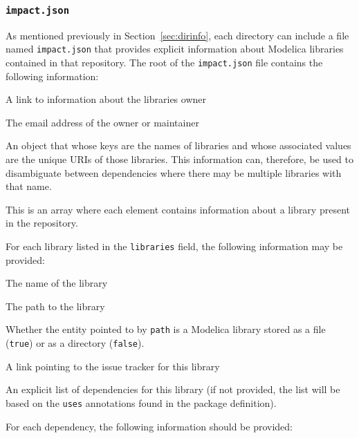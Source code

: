 \documentclass[11pt,a4paper,twocolumn]{article}
\newcommand{\code}[1]{\texttt{#1}} %
\begin{document}
\subsubsection{\code{impact.json}}
\label{sec:dirinfo_schema}

As mentioned previously in Section~\ref{sec:dirinfo}, each directory
can include a file named \code{impact.json} that provides explicit
information about Modelica libraries contained in that repository.
The root of the \code{impact.json} file contains the following
information:

\begin{description}[noitemsep]
  \item[\code{owner\_uri}] A link to information about the libraries
    owner
  \item[\code{email}] The email address of the owner or maintainer
  \item[\code{alias}] An object that whose keys are the names of
    libraries and whose associated values are the unique URIs of those
    libraries.  This information can, therefore, be used to
    disambiguate between dependencies where there may be multiple
    libraries with that name.
  \item[\code{libraries}] This is an array where each element contains
    information about a library present in the repository.
\end{description}

For each library listed in the \code{libraries} field, the following
information may be provided:

\begin{description}[noitemsep]
  \item[\code{name}] The name of the library
  \item[\code{path}] The path to the library
  \item[\code{isfile}] Whether the entity pointed to by \code{path} is
    a Modelica library stored as a file (\code{true}) or as a
    directory (\code{false}).
  \item[\code{issues\_url}] A link pointing to the issue tracker for
    this library
  \item[\code{dependencies}] An explicit list of dependencies for this
    library (if not provided, the list will be based on the
    \code{uses} annotations found in the package definition).
\end{description}

For each dependency, the following information should be provided:
\end{document}
